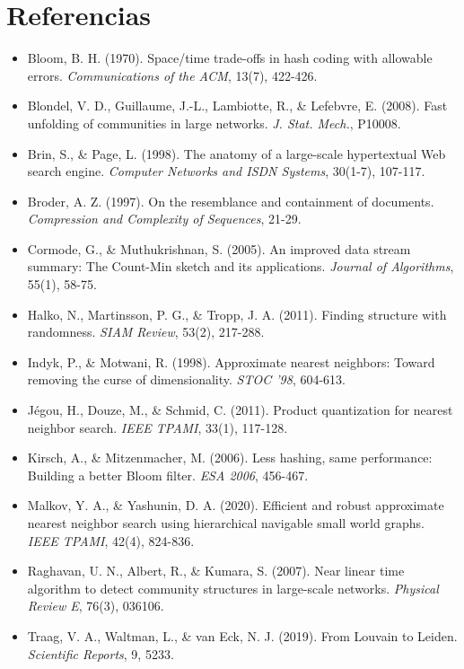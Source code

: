 \documentclass[11pt,letterpaper]{article}
\begin{document}
\section*{Referencias}
{\small
\begin{itemize}[leftmargin=1.2em,itemsep=1pt]
\item Bloom, B. H. (1970). Space/time trade-offs in hash coding with allowable errors. \emph{Communications of the ACM}, 13(7), 422-426.
\item Blondel, V. D., Guillaume, J.-L., Lambiotte, R., \& Lefebvre, E. (2008). Fast unfolding of communities in large networks. \emph{J. Stat. Mech.}, P10008.
\item Brin, S., \& Page, L. (1998). The anatomy of a large-scale hypertextual Web search engine. \emph{Computer Networks and ISDN Systems}, 30(1-7), 107-117.
\item Broder, A. Z. (1997). On the resemblance and containment of documents. \emph{Compression and Complexity of Sequences}, 21-29.
\item Cormode, G., \& Muthukrishnan, S. (2005). An improved data stream summary: The Count-Min sketch and its applications. \emph{Journal of Algorithms}, 55(1), 58-75.
\item Halko, N., Martinsson, P. G., \& Tropp, J. A. (2011). Finding structure with randomness. \emph{SIAM Review}, 53(2), 217-288.
\item Indyk, P., \& Motwani, R. (1998). Approximate nearest neighbors: Toward removing the curse of dimensionality. \emph{STOC '98}, 604-613.
\item J\'egou, H., Douze, M., \& Schmid, C. (2011). Product quantization for nearest neighbor search. \emph{IEEE TPAMI}, 33(1), 117-128.
\item Kirsch, A., \& Mitzenmacher, M. (2006). Less hashing, same performance: Building a better Bloom filter. \emph{ESA 2006}, 456-467.
\item Malkov, Y. A., \& Yashunin, D. A. (2020). Efficient and robust approximate nearest neighbor search using hierarchical navigable small world graphs. \emph{IEEE TPAMI}, 42(4), 824-836.
\item Raghavan, U. N., Albert, R., \& Kumara, S. (2007). Near linear time algorithm to detect community structures in large-scale networks. \emph{Physical Review E}, 76(3), 036106.
\item Traag, V. A., Waltman, L., \& van Eck, N. J. (2019). From Louvain to Leiden. \emph{Scientific Reports}, 9, 5233.
\end{itemize}}
\end{document}
